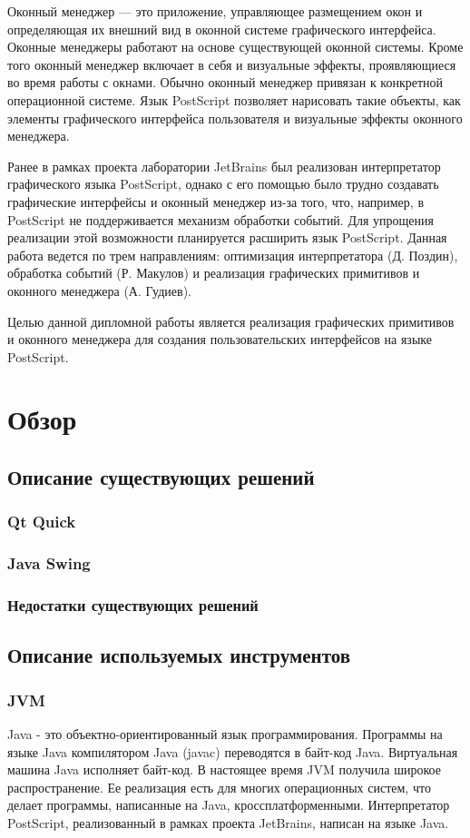 \documentclass[14pt]{extarticle}
\begin{document}
	Оконный менеджер — это приложение, управляющее размещением окон и определяющая их внешний вид в оконной системе графического интерфейса. Оконные менеджеры работают на основе существующей оконной системы. Кроме того оконный менеджер включает в себя и визуальные эффекты, проявляющиеся во время работы с окнами. Обычно оконный менеджер привязан к конкретной операционной системе. Язык PostScript позволяет нарисовать такие объекты, как элементы графического интерфейса пользователя и визуальные эффекты оконного менеджера.
	
	Ранее в рамках проекта лаборатории JetBrains был реализован интерпретатор графического языка PostScript, однако с его помощью было трудно создавать графические интерфейсы и оконный менеджер из-за того, что, например, в PostScript не поддерживается механизм обработки событий. Для упрощения реализации этой возможности планируется расширить язык PostScript. Данная работа ведется по трем направлениям: оптимизация интерпретатора (Д. Поздин), обработка событий (Р. Макулов) и реализация графических примитивов и оконного менеджера (А. Гудиев).
	
	Целью данной дипломной работы является реализация графических примитивов и оконного менеджера для создания пользовательских интерфейсов на языке PostScript.
	
	\pagebreak
	\section{Обзор}
	\subsection{ Описание существующих решений }
		\subsubsection{Qt Quick}
		\subsubsection{Java Swing}
		\subsubsection{ Недостатки существующих решений }
		
	\subsection{Описание используемых инструментов }
		\subsubsection{JVM}
		Java - это объектно-ориентированный язык программирования. Программы на языке Java компилятором Java (javac) переводятся в байт-код Java. Виртуальная машина Java исполняет байт-код. В настоящее время JVM получила широкое распространение. Ее реализация есть для многих операционных систем, что делает программы, написанные на Java, кроссплатформенными. Интерпретатор PostScript, реализованный в рамках проекта JetBrains, написан на языке Java.
\end{document}
